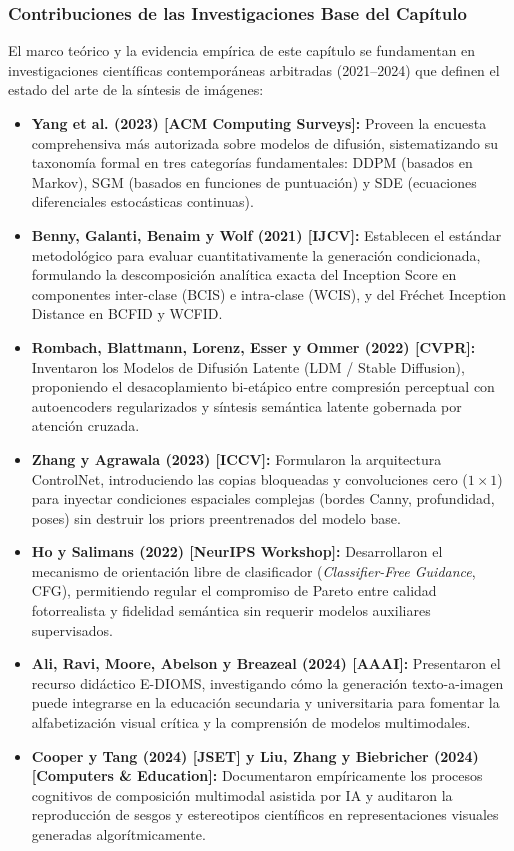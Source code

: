 \subsubsection*{Contribuciones de las Investigaciones Base del Capítulo}
El marco teórico y la evidencia empírica de este capítulo se fundamentan en investigaciones científicas contemporáneas arbitradas (2021--2024) que definen el estado del arte de la síntesis de imágenes:
\begin{itemize}[leftmargin=1.5em, itemsep=0.25em]
    \item \textbf{Yang et al. (2023) [ACM Computing Surveys]:} Proveen la encuesta comprehensiva más autorizada sobre modelos de difusión, sistematizando su taxonomía formal en tres categorías fundamentales: DDPM (basados en Markov), SGM (basados en funciones de puntuación) y SDE (ecuaciones diferenciales estocásticas continuas).
    \item \textbf{Benny, Galanti, Benaim y Wolf (2021) [IJCV]:} Establecen el estándar metodológico para evaluar cuantitativamente la generación condicionada, formulando la descomposición analítica exacta del Inception Score en componentes inter-clase (BCIS) e intra-clase (WCIS), y del Fréchet Inception Distance en BCFID y WCFID.
    \item \textbf{Rombach, Blattmann, Lorenz, Esser y Ommer (2022) [CVPR]:} Inventaron los Modelos de Difusión Latente (LDM / Stable Diffusion), proponiendo el desacoplamiento bi-etápico entre compresión perceptual con autoencoders regularizados y síntesis semántica latente gobernada por atención cruzada.
    \item \textbf{Zhang y Agrawala (2023) [ICCV]:} Formularon la arquitectura ControlNet, introduciendo las copias bloqueadas y convoluciones cero ($1 \times 1$) para inyectar condiciones espaciales complejas (bordes Canny, profundidad, poses) sin destruir los priors preentrenados del modelo base.
    \item \textbf{Ho y Salimans (2022) [NeurIPS Workshop]:} Desarrollaron el mecanismo de orientación libre de clasificador (\textit{Classifier-Free Guidance}, CFG), permitiendo regular el compromiso de Pareto entre calidad fotorrealista y fidelidad semántica sin requerir modelos auxiliares supervisados.
    \item \textbf{Ali, Ravi, Moore, Abelson y Breazeal (2024) [AAAI]:} Presentaron el recurso didáctico E-DIOMS, investigando cómo la generación texto-a-imagen puede integrarse en la educación secundaria y universitaria para fomentar la alfabetización visual crítica y la comprensión de modelos multimodales.
    \item \textbf{Cooper y Tang (2024) [JSET] y Liu, Zhang y Biebricher (2024) [Computers \& Education]:} Documentaron empíricamente los procesos cognitivos de composición multimodal asistida por IA y auditaron la reproducción de sesgos y estereotipos científicos en representaciones visuales generadas algorítmicamente.
\end{itemize}

